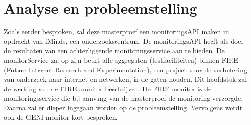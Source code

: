 \newpage
\chapter{Analyse en probleemstelling}
{\samenvatting
Zoals eerder besproken, zal deze masterproef een monitoringsAPI maken in opdracht van iMinds, een onderzoekscentrum. De monitoringsAPI heeft als doel de resultaten van een achterliggende monitoringsservice aan te bieden. De monitorService zal op zijn beurt alle aggregaten (testfaciliteiten) binnen FIRE (Future Internet Research and Experimentation), een project voor de verbetering van onderzoek naar internet en netwerken, in de gaten houden. Dit hoofdstuk zal de werking van de FIRE monitor beschrijven. De FIRE monitor is de monitoringsservice die bij aanvang van de masterproef de monitoring verzorgde. Daarna zal er dieper ingegaan worden op de probleemstelling. Vervolgens wordt ook de GENI monitor kort besproken.}
